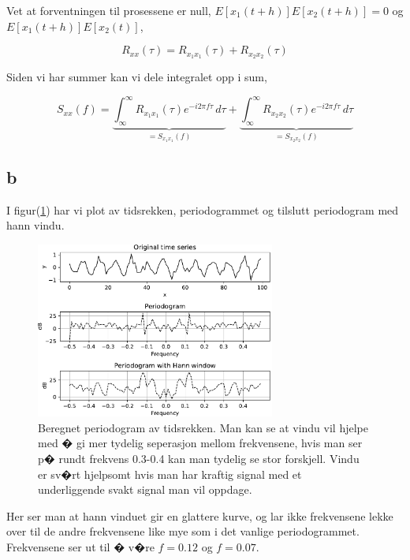 {Vet at forventningen til prosessene er null, $E[x_{1}(t+h)]E[x_{2}(t+h)] = 0$ og $ E[x_{1}(t+h)]E[x_{2}(t)]$,

\begin{equation}
    R_{xx}(\tau) = R_{x_{1}x_{1}}(\tau) + R_{x_{2}x_{2}}(\tau)
\end{equation}

Siden vi har summer kan vi dele integralet opp i sum,


\begin{equation}
    S_{xx}(f) = \underbrace{\int_{\infty}^{\infty}R_{x_{1}x_{1}}(\tau)e^{-i2\pi f\tau}\,d\tau}_{= S_{x_{1}x_{1}}(f)} + \underbrace{\int_{\infty}^{\infty}R_{x_{2}x_{2}}(\tau)e^{-i2\pi f\tau}\,d\tau}_{= S_{x_{2}x_{2}}(f)}
\end{equation}


\subsection{b}

I figur(\ref{taskb}) har vi plot av tidsrekken, periodogrammet og tilslutt periodogram med hann vindu.

\begin{figure}[hbt!]
{\centering
    \includegraphics[width=0.70\textwidth]{taskb.pdf}
    \caption{Beregnet periodogram av tidsrekken. Man kan se at vindu vil hjelpe med � gi mer tydelig seperasjon mellom frekvensene, hvis man ser p� rundt frekvens 0.3-0.4 kan man tydelig se stor forskjell. Vindu er sv�rt hjelpsomt hvis man har kraftig signal med et underliggende svakt signal man vil oppdage.}
    \label{taskb}
\par}
\end{figure}


Her ser man at hann vinduet gir en glattere kurve, og lar ikke frekvensene lekke over til de andre frekvensene like mye som i det vanlige periodogrammet. Frekvensene ser ut til � v�re $f =  0.12$ og $f = 0.07$.


}
